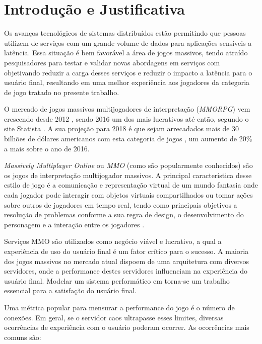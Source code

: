 \section{Introdução e Justificativa}
\label{sec:int}

Os avanços tecnológicos de sistemas distribuídos estão permitindo que pessoas utilizem de serviços com um grande volume de dados para aplicações sensíveis a latência. Essa situação é bem favorável a área de jogos massivos, tendo atraído pesquisadores para testar e validar novas abordagens em serviços com objetivando reduzir a carga desses serviços e reduzir o impacto a latência para o usuário final, resultando em uma melhor experiência aos jogadores da categoria de jogo tratado no presente trabalho\cite{mmo_analytic}.

O mercado de jogos massivos multijogadores de interpretação (\textit{MMORPG}) vem crescendo desde 2012 \cite{new_york_times}, sendo 2016 um dos mais lucrativos até então, segundo o site Statista \cite{statista_2016}. A sua projeção para 2018 é que sejam arrecadados mais de 30 bilhões de dólares americanos com esta categoria de jogos \cite{statista_2018}, um aumento de 20\% a mais sobre o ano de 2016.

\textit{Massively Multiplayer Online} ou \textit{MMO} (como são popularmente conhecidos) são os jogos de interpretação multijogador massivos. A principal característica desse estilo de jogo é a comunicação e representação virtual de um mundo fantasia onde cada jogador pode interagir com objetos virtuais compartilhados ou tomar ações sobre outros de jogadores em tempo real, tendo como principais objetivos a resolução de problemas conforme a sua regra de design, o desenvolvimento do personagem e a interação entre os jogadores \cite{video_game_technologies}.

Serviços MMO são utilizados como negócio viável e lucrativo, a qual a experiência de uso do usuário final é um fator crítico para o sucesso. A maioria dos jogos massivos no mercado atual dispoem de uma arquitetura com diversos servidores, onde a performance destes servidores influenciam na experiência do usuário final. Modelar um sistema performático em torna-se um trabalho essencial para a satisfação do usuário final\cite{1417630}.

Uma métrica popular para mensurar a performance do jogo é o número de conexões. Em geral, se o servidor caos ultrapasse esses limites, diversas ocorrências de experiência com o usuário poderam ocorrer\cite{1417630}. As ocorrências mais comuns são:

